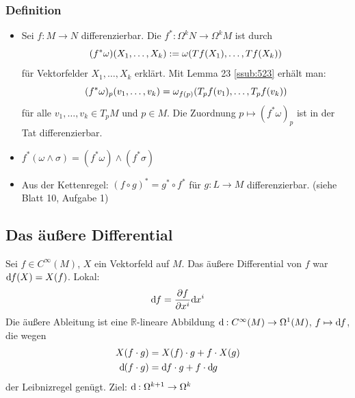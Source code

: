 \subsubsection[Definition: Induzierte Abbildung]{Definition} %
\label{ssub:524}
\begin{itemize}
	\item Sei $f : M \to N$ differenzierbar. Die   $f^* : \Omega^k N \to \Omega^k M$ ist durch
	\[
		\enbrace*{f^* \omega} \enbrace*{X_1, \ldots , X_k} := \omega \enbrace*{T f(X_1), \ldots , T f (X_k)}   
	\]
	für Vektorfelder $X_1, \ldots , X_k$ erklärt.
	Mit Lemma 23 \ref{ssub:523} erhält man:
	\[
		(f^* \omega)_p (v_1, \ldots , v_k) = \omega_{f(p)} \enbrace*{T_p f(v_1), \ldots , T_p f (v_k)} 
	\]
	für alle $v_1, \ldots , v_k \in T_p M$ und $p \in M$. Die Zuordnung $p \mapsto (f^* \omega)_p$ ist in der Tat differenzierbar.
	\item $f^*(\omega \wedge \sigma) = (f^* \omega) \wedge (f^* \sigma)$
	\item Aus der Kettenregel: $(f \circ g)^* = g^* \circ  f^*$ für $g : L \to M$ differenzierbar. \hfill(siehe Blatt 10, Aufgabe 1)
\end{itemize}

\subsection{Das äußere Differential} %
\label{sub:53}
Sei $f \in C^\infty(M)$, $X$ ein Vektorfeld auf $M$. Das äußere Differential von $f$ war $\mathrm{d}\mkern-1.0mu f(X) = X(f)$. Lokal:
\[
	\mathrm{d}\mkern-1.0mu f = \frac{{\partial f}}{{\partial x^i}}  \mathrm{d}\mkern-1.0mu x^i 
\]
Die äußere Ableitung ist eine $\mathds{R}$-lineare Abbildung $\mathrm{d}\mkern-1.0mu  : C^\infty(M) \to \Omega^1(M)$, $f \mapsto \mathrm{d}\mkern-1.0mu f$, die wegen 
\begin{align*}
	X(f \cdot g) &= X(f) \cdot g + f \cdot X(g) \\
	\mathrm{d}\mkern-1.0mu (f \cdot g) &= \mathrm{d}\mkern-1.0mu f \cdot g + f \cdot \mathrm{d}\mkern-1.0mu  g
\end{align*}
der Leibnizregel genügt. Ziel: $\mathrm{d}\mkern-1.0mu  : \Omega^{k+1} \to \Omega^k$

